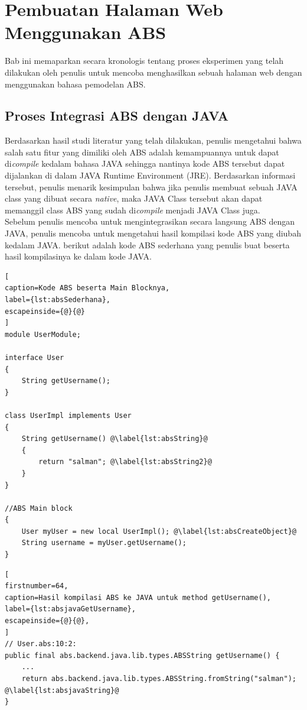 \chapter{Pembuatan Halaman Web Menggunakan ABS}

Bab ini memaparkan secara kronologis tentang proses eksperimen yang telah dilakukan oleh penulis untuk mencoba menghasilkan sebuah halaman web dengan menggunakan bahasa pemodelan ABS.

\section{Proses Integrasi ABS dengan JAVA}
Berdasarkan hasil studi literatur yang telah dilakukan, penulis mengetahui bahwa salah satu fitur yang dimiliki oleh ABS adalah kemampuannya untuk dapat di\textit{compile} kedalam bahasa JAVA sehingga nantinya kode ABS tersebut dapat dijalankan di dalam JAVA Runtime Environment (JRE). Berdasarkan informasi tersebut, penulis menarik kesimpulan bahwa jika penulis membuat sebuah JAVA class yang dibuat secara \textit{native}, maka JAVA Class tersebut akan dapat memanggil class ABS yang sudah di\textit{compile} menjadi JAVA Class juga.\\

Sebelum penulis mencoba untuk mengintegrasikan secara langsung ABS dengan JAVA, penulis mencoba untuk mengetahui hasil kompilasi kode ABS yang diubah kedalam JAVA. berikut adalah kode ABS sederhana yang penulis buat beserta hasil kompilasinya ke dalam kode JAVA.

\begin{lstlisting}[
caption=Kode ABS beserta Main Blocknya,
label={lst:absSederhana},
escapeinside={@}{@}
]
module UserModule;

interface User
{
	String getUsername();
}

class UserImpl implements User
{
	String getUsername() @\label{lst:absString}@
	{
		return "salman"; @\label{lst:absString2}@
	}
}

//ABS Main block
{
	User myUser = new local UserImpl(); @\label{lst:absCreateObject}@
	String username = myUser.getUsername();
}
\end{lstlisting}

\begin{lstlisting}[ 
firstnumber=64,
caption=Hasil kompilasi ABS ke JAVA untuk method getUsername(),
label={lst:absjavaGetUsername},
escapeinside={@}{@},
]
// User.abs:10:2: 
public final abs.backend.java.lib.types.ABSString getUsername() {
    ...
    return abs.backend.java.lib.types.ABSString.fromString("salman"); @\label{lst:absjavaString}@
}
\end{lstlisting}

